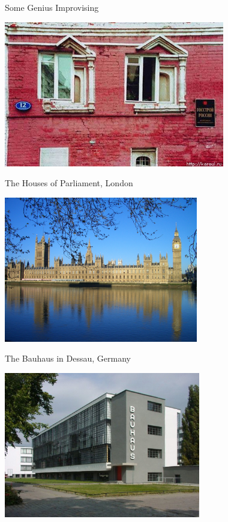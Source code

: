 \begin{frame}[fragile]{Some Genius Improvising}
\begin{center}
  \includegraphics[height=180pt]{badbuilding1.jpg}
\end{center}
\end{frame}

\begin{frame}[fragile]{The Houses of Parliament, London}
\begin{center}
  \includegraphics[height=180pt]{Westminster.jpg}
\end{center}
\end{frame}

\begin{frame}[fragile]{The Bauhaus in Dessau, Germany}
\begin{center}
  \includegraphics[height=180pt]{Bauhaus.jpg}
\end{center}
\end{frame}

